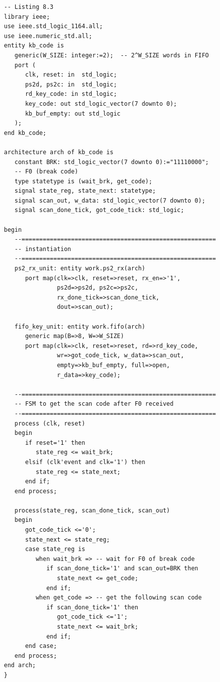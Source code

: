 \documentclass[a4paper,12pt,twoside]{article}
\begin{document}
\begin{lstlisting}
-- Listing 8.3
library ieee;
use ieee.std_logic_1164.all;
use ieee.numeric_std.all;
entity kb_code is
   generic(W_SIZE: integer:=2);  -- 2^W_SIZE words in FIFO
   port (
      clk, reset: in  std_logic;
      ps2d, ps2c: in  std_logic;
      rd_key_code: in std_logic;
      key_code: out std_logic_vector(7 downto 0);
      kb_buf_empty: out std_logic
   );
end kb_code;

architecture arch of kb_code is
   constant BRK: std_logic_vector(7 downto 0):="11110000";
   -- F0 (break code)
   type statetype is (wait_brk, get_code);
   signal state_reg, state_next: statetype;
   signal scan_out, w_data: std_logic_vector(7 downto 0);
   signal scan_done_tick, got_code_tick: std_logic;

begin
   --=======================================================
   -- instantiation
   --=======================================================
   ps2_rx_unit: entity work.ps2_rx(arch)
      port map(clk=>clk, reset=>reset, rx_en=>'1',
               ps2d=>ps2d, ps2c=>ps2c,
               rx_done_tick=>scan_done_tick,
               dout=>scan_out);

   fifo_key_unit: entity work.fifo(arch)
      generic map(B=>8, W=>W_SIZE)
      port map(clk=>clk, reset=>reset, rd=>rd_key_code,
               wr=>got_code_tick, w_data=>scan_out,
               empty=>kb_buf_empty, full=>open,
               r_data=>key_code);

   --=======================================================
   -- FSM to get the scan code after F0 received
   --=======================================================
   process (clk, reset)
   begin
      if reset='1' then
         state_reg <= wait_brk;
      elsif (clk'event and clk='1') then
         state_reg <= state_next;
      end if;
   end process;

   process(state_reg, scan_done_tick, scan_out)
   begin
      got_code_tick <='0';
      state_next <= state_reg;
      case state_reg is
         when wait_brk => -- wait for F0 of break code
            if scan_done_tick='1' and scan_out=BRK then
               state_next <= get_code;
            end if;
         when get_code => -- get the following scan code
            if scan_done_tick='1' then
               got_code_tick <='1';
               state_next <= wait_brk;
            end if;
      end case;
   end process;
end arch;
} \end{lstlisting}

\end{document}

